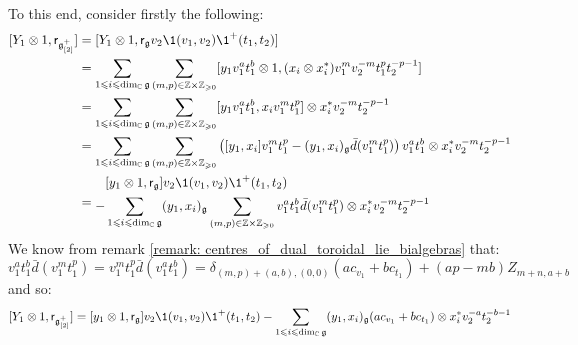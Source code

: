 \begin{remark}
\begin{enumerate}
\begin{enumerate}
                        To this end, consider firstly the following:
                            $$
                                \begin{aligned}
                                    [Y_1 \tensor 1, \sfr_{\g_{[2]}^+}] & = [Y_1 \tensor 1, \sfr_{\g} v_2 \1(v_1, v_2) \1^+(t_1, t_2)]
                                    \\
                                    & = \sum_{1 \leq i \leq \dim_{\bbC} \g} \sum_{(m, p) \in \Z \x \Z_{\geq 0}} [y_1 v_1^a t_1^b \tensor 1, (x_i \tensor x_i^*) v_1^m v_2^{-m} t_1^p t_2^{-p - 1}] 
                                    \\
                                    & = \sum_{1 \leq i \leq \dim_{\bbC} \g} \sum_{(m, p) \in \Z \x \Z_{\geq 0}} [y_1 v_1^a t_1^b, x_i v_1^m t_1^p] \tensor x_i^* v_2^{-m} t_2^{-p - 1} 
                                    \\
                                    & = \sum_{1 \leq i \leq \dim_{\bbC} \g} \sum_{(m, p) \in \Z \x \Z_{\geq 0}} \left( [y_1, x_i] v_1^m t_1^p - (y_1, x_i)_{\g} \bar{d}(v_1^m t_1^p) \right) v_1^a t_1^b \tensor x_i^* v_2^{-m} t_2^{-p - 1} 
                                    \\
                                    & = 
                                    \begin{aligned}
                                        & [y_1 \tensor 1, \sfr_{\g}] v_2 \1(v_1, v_2) \1^+(t_1, t_2)
                                        \\
                                        - & \sum_{1 \leq i \leq \dim_{\bbC} \g} (y_1, x_i)_{\g} \sum_{(m, p) \in \Z \x \Z_{\geq 0}} v_1^a t_1^b \bar{d}(v_1^m t_1^p) \tensor x_i^* v_2^{-m} t_2^{-p - 1} 
                                    \end{aligned}
                                \end{aligned}
                            $$
                        We know from remark \ref{remark: centres_of_dual_toroidal_lie_bialgebras} that:
                            $$v_1^a t_1^b \bar{d}(v_1^m t_1^p) = v_1^m t_1^p \bar{d}(v_1^a t_1^b) = \delta_{(m, p) + (a, b), (0, 0)} ( a c_{v_1} + b c_{t_1} ) + (ap - mb) Z_{m + n, a + b}$$
                        and so:
                            $$[Y_1 \tensor 1, \sfr_{\g_{[2]}^+}] = [y_1 \tensor 1, \sfr_{\g}] v_2 \1(v_1, v_2) \1^+(t_1, t_2) - \sum_{1 \leq i \leq \dim_{\bbC} \g} (y_1, x_i)_{\g} ( a c_{v_1} + b c_{t_1} ) \tensor x_i^* v_2^{-a} t_2^{-b - 1}$$
                            

\end{enumerate}
\end{enumerate}
\end{remark}
